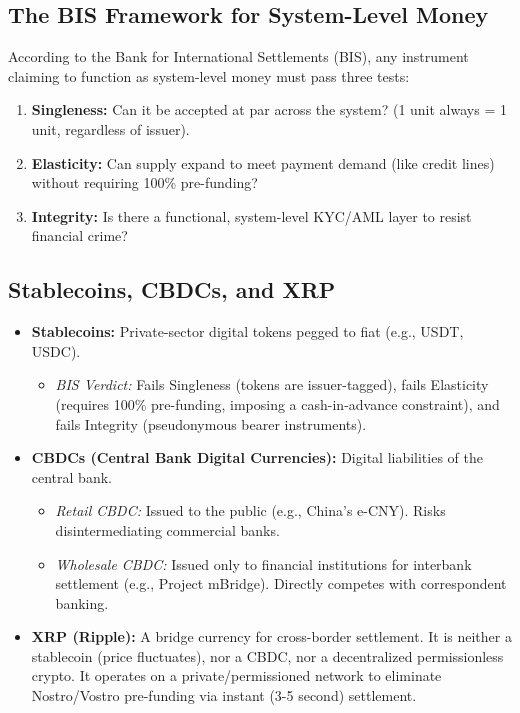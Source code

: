 \subsection{The BIS Framework for System-Level Money}
According to the Bank for International Settlements (BIS), any instrument
claiming to function as system-level money must pass three tests:
\begin{enumerate}
    \item \textbf{Singleness:} Can it be accepted at par across the system? (1 unit always = 1
          unit, regardless of issuer).
    \item \textbf{Elasticity:} Can supply expand to meet payment demand (like credit lines)
          without requiring 100\% pre-funding?
    \item \textbf{Integrity:} Is there a functional, system-level KYC/AML layer to resist
          financial crime?
\end{enumerate}

\subsection{Stablecoins, CBDCs, and XRP}
\begin{itemize}
    \item \textbf{Stablecoins:} Private-sector digital tokens pegged to fiat (e.g., USDT, USDC).
          \begin{itemize}
              \item \textit{BIS Verdict:} Fails Singleness (tokens are issuer-tagged), fails Elasticity
                    (requires 100\% pre-funding, imposing a cash-in-advance constraint), and fails
                    Integrity (pseudonymous bearer instruments).
          \end{itemize}
    \item \textbf{CBDCs (Central Bank Digital Currencies):} Digital liabilities of the central
          bank.
          \begin{itemize}
              \item \textit{Retail CBDC:} Issued to the public (e.g., China's e-CNY). Risks
                    disintermediating commercial banks.
              \item \textit{Wholesale CBDC:} Issued only to financial institutions for interbank settlement
                    (e.g., Project mBridge). Directly competes with correspondent banking.
          \end{itemize}
    \item \textbf{XRP (Ripple):} A bridge currency for cross-border settlement. It is neither a
          stablecoin (price fluctuates), nor a CBDC, nor a decentralized permissionless
          crypto. It operates on a private/permissioned network to eliminate
          Nostro/Vostro pre-funding via instant (3-5 second) settlement.
\end{itemize}

